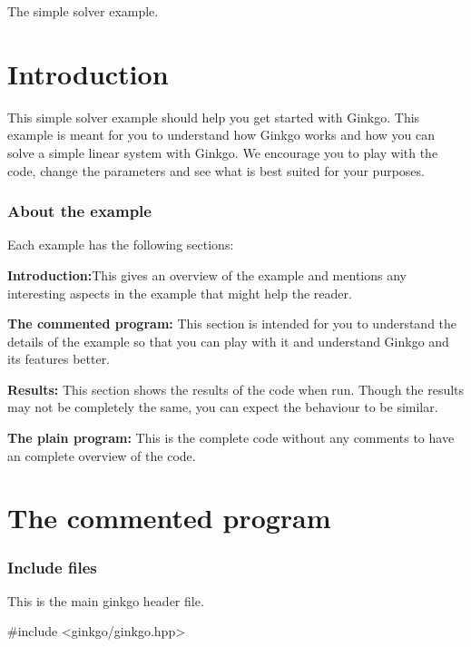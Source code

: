 The simple solver example.

 \label{_Intro}%
 \label{_Introduction}%
\section*{Introduction}

This simple solver example should help you get started with Ginkgo. This example is meant for you to understand how Ginkgo works and how you can solve a simple linear system with Ginkgo. We encourage you to play with the code, change the parameters and see what is best suited for your purposes.

\label{_Abouttheexample}%
\subsubsection*{About the example }

Each example has the following sections\+: 
\begin{DoxyEnumerate}
\item {\bfseries Introduction\+:}This gives an overview of the example and mentions any interesting aspects in the example that might help the reader. 
\item {\bfseries The commented program\+:} This section is intended for you to understand the details of the example so that you can play with it and understand Ginkgo and its features better. 
\item {\bfseries Results\+:} This section shows the results of the code when run. Though the results may not be completely the same, you can expect the behaviour to be similar. 
\item {\bfseries The plain program\+:} This is the complete code without any comments to have an complete overview of the code. 
\end{DoxyEnumerate}\label{_CommProg}%
 \section*{The commented program}

\label{_Includefiles}%
 \subsubsection*{Include files}

This is the main ginkgo header file.


\begin{DoxyCode}
\textcolor{preprocessor}{#include <ginkgo/ginkgo.hpp>}
\end{DoxyCode}


